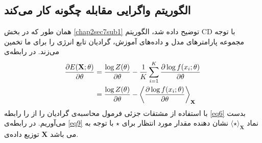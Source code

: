 \subsection{الگوریتم واگرایی مقابله چگونه کار می‌کند}
همان طور که در بخش
\ref{chap2sec7sub1}
توضیح داده شد، الگوریتم
CD
با توجه مجموعه پارامترهای مدل و داده‌های آموزش، گرادیان تابع انرژی را برای ما تخمین می‌‌زند.  در رابطه‌ی
\begin{align}
	\centering
	\label{eq9}
	\dfrac{\partial E(\textbf{X};\theta)}{\partial \theta} &= \dfrac{\log Z(\theta)}{\partial \theta} - \dfrac{1}{K}\sum_{i=1}^K\dfrac{\partial \log f(x_i;\theta)}{\partial \theta}\\\nonumber
	&= \dfrac{\log Z(\theta)}{\partial \theta} - \left\langle \dfrac{\partial \log f(x_i;\theta)}{\partial \theta}\right\rangle_\textbf{X}
\end{align}
 با استفاده از مشتقات جزئی فرمول محاسبه‌ی گرادیان را از را رابطه
\ref{eq6}
 بدست می‌‌آوریم. در رابطه‌ی
\ref{eq9}
 نماد
$\langle \star \rangle_\textbf{X}$
 نشان دهنده مقدار مورد انتظار برای
$\star$
 با توجه به توزیع داده‌ی
\textbf{X}
 می‌ باشد.

